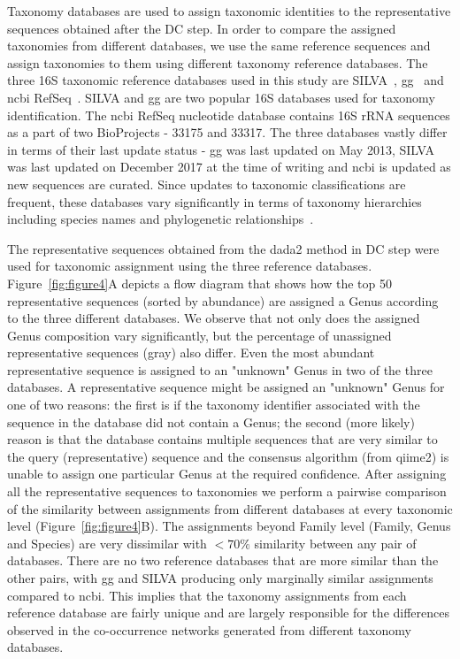   Taxonomy databases are used to assign taxonomic identities to the representative sequences obtained after the DC step.
  In order to compare the assigned taxonomies from different databases, we use the same reference sequences and assign taxonomies to them using different taxonomy reference databases.
  The three 16S taxonomic reference databases used in this study are SILVA~\cite{Quast2012}, \ac{gg}~\cite{DeSantis2006} and \ac{ncbi} RefSeq~\cite{Sayers2009}.
  SILVA and \ac{gg} are two popular 16S databases used for taxonomy identification.
  The \ac{ncbi} RefSeq nucleotide database contains 16S rRNA sequences as a part of two BioProjects - 33175 and 33317.
  The three databases vastly differ in terms of their last update status - \ac{gg} was last updated on May 2013, SILVA was last updated on December 2017 at the time of writing and \ac{ncbi} is updated as new sequences are curated.
  Since updates to taxonomic classifications are frequent, these databases vary significantly in terms of taxonomy hierarchies including species names and phylogenetic relationships~\cite{Balvociute2017}.

  The representative sequences obtained from the \ac{dada2} method in DC step were used for taxonomic assignment using the three reference databases.
  Figure~\ref{fig:figure4}A depicts a flow diagram that shows how the top 50 representative sequences (sorted by abundance) are assigned a Genus according to the three different databases.
  We observe that not only does the assigned Genus composition vary significantly, but the percentage of unassigned representative sequences (gray) also differ.
  Even the most abundant representative sequence is assigned to an "unknown" Genus in two of the three databases.
  A representative sequence might be assigned an "unknown" Genus for one of two reasons: the first is if the taxonomy identifier associated with the sequence in the database did not contain a Genus; the second (more likely) reason is that the database contains multiple sequences that are very similar to the query (representative) sequence and the consensus algorithm (from \ac{qiime2}) is unable to assign one particular Genus at the required confidence.
  After assigning all the representative sequences to taxonomies we perform a pairwise comparison of the similarity between assignments from different databases at every taxonomic level (Figure~\ref{fig:figure4}B).
  The assignments beyond Family level (Family, Genus and Species) are very dissimilar with $<70\%$ similarity between any pair of databases.
  There are no two reference databases that are more similar than the other pairs, with \ac{gg} and SILVA producing only marginally similar assignments compared to \ac{ncbi}.
  This implies that the taxonomy assignments from each reference database are fairly unique and are largely responsible for the differences observed in the co-occurrence networks generated from different taxonomy databases.


